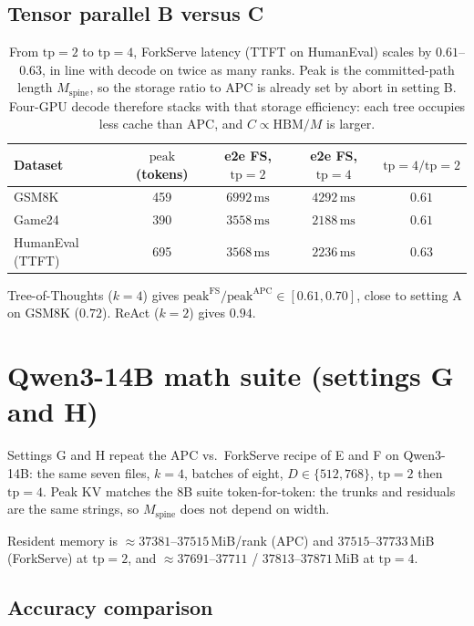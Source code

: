 \documentclass[11pt,a4paper]{article}
\begin{document}
\subsection{Tensor parallel B versus C}

\begin{table}[h]
\centering
\small
\begin{tabular}{@{}lcccc@{}}
\toprule
Dataset & $\mathrm{peak}$ (tokens) & e2e FS, $\mathrm{tp}{=}2$ & e2e FS, $\mathrm{tp}{=}4$ & $\mathrm{tp}{=}4/\mathrm{tp}{=}2$ \\
\midrule
GSM8K & 459 & $6992\,\mathrm{ms}$ & $4292\,\mathrm{ms}$ & $0.61$ \\
Game24 & 390 & $3558\,\mathrm{ms}$ & $2188\,\mathrm{ms}$ & $0.61$ \\
HumanEval (TTFT) & 695 & $3568\,\mathrm{ms}$ & $2236\,\mathrm{ms}$ & $0.63$ \\
\bottomrule
\end{tabular}
\caption{From $\mathrm{tp}{=}2$ to $\mathrm{tp}{=}4$, ForkServe latency (TTFT on HumanEval) scales by $0.61$--$0.63$, in line with decode on twice as many ranks.
Peak is the committed-path length $M_{\mathrm{spine}}$, so the storage ratio to APC is already set by abort in setting B.
Four-GPU decode therefore stacks with that storage efficiency: each tree occupies less cache than APC, and $C\propto\mathrm{HBM}/M$ is larger.}
\end{table}

Tree-of-Thoughts ($k{=}4$) gives $\mathrm{peak}^{\mathrm{FS}}/\mathrm{peak}^{\mathrm{APC}}\in[0.61,0.70]$, close to setting A on GSM8K ($0.72$).
ReAct ($k{=}2$) gives $0.94$.

\section{Qwen3-14B math suite (settings G and H)}

Settings G and H repeat the APC vs.\ ForkServe recipe of E and F on Qwen3-14B:
the same seven files, $k{=}4$, batches of eight, $D{\in}\{512,768\}$, $\mathrm{tp}{=}2$ then $\mathrm{tp}{=}4$.
Peak KV matches the 8B suite token-for-token: the trunks and residuals are the same strings, so $M_{\mathrm{spine}}$ does not depend on width.

Resident memory is $\approx 37381$--$37515$\,MiB/rank (APC) and $37515$--$37733$\,MiB (ForkServe) at $\mathrm{tp}{=}2$,
and $\approx 37691$--$37711$ / $37813$--$37871$\,MiB at $\mathrm{tp}{=}4$.

\subsection{Accuracy comparison}
\end{document}
